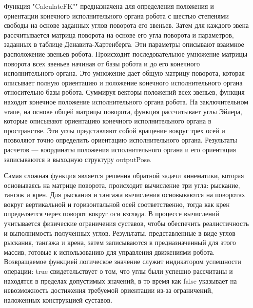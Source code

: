 Функция "CalculateFK"" предназначена для определения положения и ориентации конечного исполнительного органа робота с шестью степенями свободы на основе заданных углов поворота его звеньев. Затем для каждого звена рассчитывается матрица поворота на основе его угла поворота и параметров, заданных в таблице Денавита-Хартенберга. Эти параметры описывают взаимное расположение звеньев робота. Происходит последовательное умножение матрицы поворота всех звеньев начиная от базы робота и до его конечного исполнительного органа. Это умножение дает общую матрицу поворота, которая описывает полную ориентацию и положение конечного исполнительного органа относительно базы робота.
Суммируя векторы положений всех звеньев, функция находит конечное положение исполнительного органа робота.
На заключительном этапе, на основе общей матрицы поворота, функция рассчитывает углы Эйлера, которые описывают ориентацию конечного исполнительного органа в пространстве. Эти углы представляют собой вращение вокруг трех осей и позволяют точно определить ориентацию исполнительного органа. Результаты расчетов — координаты положения исполнительного органа и его ориентация записываются в выходную структуру outputPose.

Самая сложная функция является решения обратной задачи кинематики, которая основываясь на матрице поворота, происходит вычисление три угла: рыскание, тангаж и крен. Для рыскания и тангажа вычисления основываются на поворотах вокруг вертикальной и горизонтальной осей соответственно, тогда как крен определяется через поворот вокруг оси взгляда. В процессе вычислений учитывается физические ограничения суставов, чтобы обеспечить реалистичность и выполнимость полученных углов. Результаты, представленные в виде углов рыскания, тангажа и крена, затем записываются в предназначенный для этого массив, готовые к использованию для управления движениями робота. Возвращаемое функцией логическое значение служит индикатором успешности операции: true свидетельствует о том, что углы были успешно рассчитаны и находятся в пределах допустимых значений, в то время как false указывает на невозможность достижения требуемой ориентации из-за ограничений, наложенных конструкцией суставов.